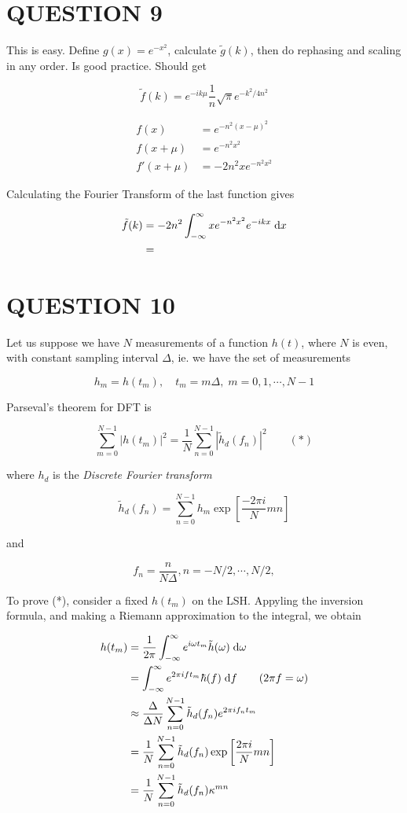 \documentclass[a4paper]{article}
\begin{document}
\section{QUESTION 9}

This is easy. Define $ g(x) = e^{-x^{2}} $, calculate $ \tilde{g}(k) $, then do rephasing and scaling in any order. Is good practice. Should get

\[ \tilde{f}(k) = e^{-ik\mu} \frac{1}{n} \sqrt{\pi} e^{-k^{2}/4 n^{2}} \]


\begin{align*}
f(x) & = e^{-n^{2}(x - \mu)^{2}} \\
f(x + \mu) & = e^{-n^{2}x^{2}} \\
f'(x +  \mu) & = -2n^{2} xe^{-n^{2}x^{2}}  
\end{align*}

Calculating the Fourier Transform of the last function gives

\begin{align*}
\tilde{f}(k) & = -2n^{2} \int_{-\infty}^{\infty}  xe^{-n^{2}x^{2}}   e^{-ikx} \; \mathrm{d} x  \\
& = 
\end{align*}

\section{QUESTION 10}


Let us suppose we have $ N $ measurements of a function $ h(t) $, where $ N $ is even, with constant sampling interval $ \Delta $, ie. we have the set of measurements

\[ h_{m} = h(t_{m}), \quad t_{m} = m \Delta, \; m = 0,1,\cdots,N-1 \]

Parseval's theorem for DFT is

\[ \sum_{m=0}^{N-1} | h(t_{m}) |^{2} = \frac{1}{N} \sum_{n=0}^{N-1} | \tilde{h}_{d}(f_{n}) |^{2} \qquad (*) \]

where $ h_{d} $ is the \emph{Discrete Fourier transform} 

\[ \tilde{h}_{d}(f_{n}) = \sum_{n=0}^{N-1} h_{m} \exp\left[ \frac{-2\pi i}{N} mn \right]   \]

and 

\[ f_{n} = \frac{n}{N \Delta}, n = -N / 2,\cdots,N/2,  \]

To prove (*), consider a fixed $ h(t_{m}) $ on the LSH. Appyling the inversion formula, and making a Riemann approximation to the integral, we obtain

\begin{align*}
h(t_{m}) & = \frac{1}{2\pi} \int_{-\infty}^{\infty} e^{i \omega t_{m}} \tilde{h}(\omega) \; \mathrm{d} \omega  \\
& = \int_{-\infty}^{\infty} e^{2 \pi i f t_{m}} \hbar(f) \; \mathrm{d} f  \qquad  ( 2\pi f = \omega)\\
& \approx \frac{\Delta}{\Delta N} \sum_{n=0}^{N-1} \tilde{h}_{d} (f_{n}) e^{2 \pi i f_{n} t_{m}} \\
& = \frac{1}{N} \sum_{n=0}^{N-1} \tilde{h}_{d}(f_{n}) \exp \left[  \frac{2 \pi i}{N} mn \right] \\
& = \frac{1}{N} \sum_{n=0}^{N-1} \tilde{h}_{d}(f_{n}) \kappa^{mn}
\end{align*}
\end{document}
